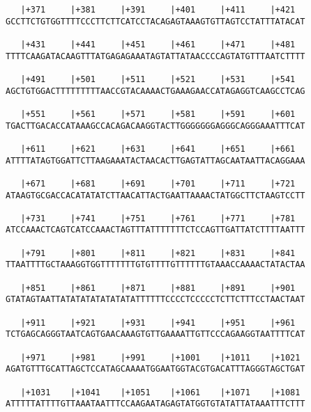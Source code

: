 \documentclass{article}
\begin{document}
\begin{Verbatim}
   |+371     |+381     |+391     |+401     |+411     |+421  
GCCTTCTGTGGTTTTCCCTTCTTCATCCTACAGAGTAAAGTGTTAGTCCTATTTATACAT
                                                            
   |+431     |+441     |+451     |+461     |+471     |+481  
TTTTCAAGATACAAGTTTATGAGAGAAATAGTATTATAACCCCAGTATGTTTAATCTTTT
                                                            
   |+491     |+501     |+511     |+521     |+531     |+541  
AGCTGTGGACTTTTTTTTTAACCGTACAAAACTGAAAGAACCATAGAGGTCAAGCCTCAG
                                                            
   |+551     |+561     |+571     |+581     |+591     |+601  
TGACTTGACACCATAAAGCCACAGACAAGGTACTTGGGGGGGAGGGCAGGGAAATTTCAT
                                                            
   |+611     |+621     |+631     |+641     |+651     |+661  
ATTTTATAGTGGATTCTTAAGAAATACTAACACTTGAGTATTAGCAATAATTACAGGAAA
                                                            
   |+671     |+681     |+691     |+701     |+711     |+721  
ATAAGTGCGACCACATATATCTTAACATTACTGAATTAAAACTATGGCTTCTAAGTCCTT
                                                            
   |+731     |+741     |+751     |+761     |+771     |+781  
ATCCAAACTCAGTCATCCAAACTAGTTTATTTTTTTCTCCAGTTGATTATCTTTTAATTT
                                                            
   |+791     |+801     |+811     |+821     |+831     |+841  
TTAATTTTGCTAAAGGTGGTTTTTTTGTGTTTTGTTTTTTGTAAACCAAAACTATACTAA
                                                            
   |+851     |+861     |+871     |+881     |+891     |+901  
GTATAGTAATTATATATATATATATATTTTTTCCCCTCCCCCTCTTCTTTCCTAACTAAT
                                                            
   |+911     |+921     |+931     |+941     |+951     |+961  
TCTGAGCAGGGTAATCAGTGAACAAAGTGTTGAAAATTGTTCCCAGAAGGTAATTTTCAT
                                                            
   |+971     |+981     |+991     |+1001    |+1011    |+1021 
AGATGTTTGCATTAGCTCCATAGCAAAATGGAATGGTACGTGACATTTAGGGTAGCTGAT
                                                            
   |+1031    |+1041    |+1051    |+1061    |+1071    |+1081 
ATTTTTATTTTGTTAAATAATTTCCAAGAATAGAGTATGGTGTATATTATAAATTTCTTT
                                                            

\end{Verbatim}
\end{document}
